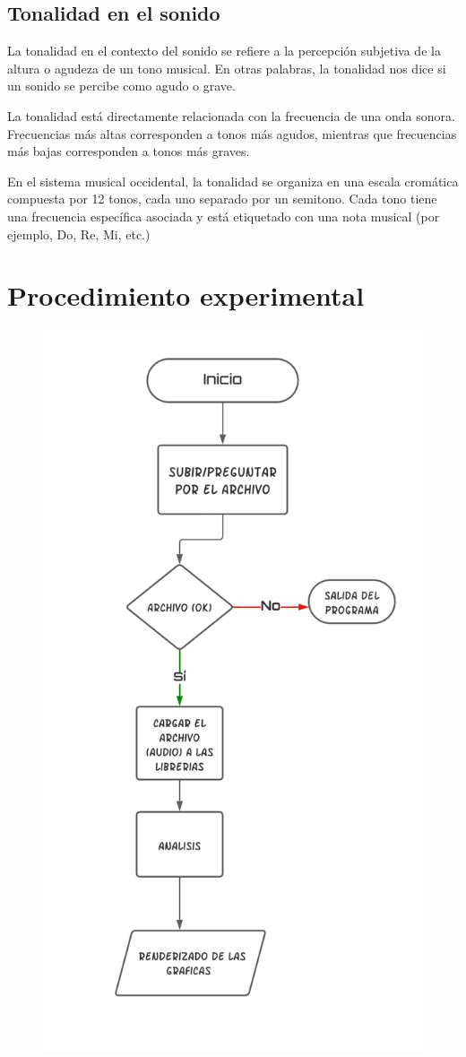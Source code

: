 \documentclass[letterpaper, 12pt]{article}
\begin{document}
\subsection*{Tonalidad en el sonido~\cite{tonalidad}}

La tonalidad en el contexto del sonido se refiere a la
percepción subjetiva de la altura o agudeza de un tono
musical. En otras palabras, la tonalidad nos dice si un
sonido se percibe como agudo o grave.

La tonalidad está directamente relacionada con la
frecuencia de una onda sonora. Frecuencias más altas
corresponden a tonos más agudos, mientras que frecuencias
más bajas corresponden a tonos más graves.

En el sistema musical occidental, la tonalidad se organiza
en una escala cromática compuesta por 12 tonos, cada uno
separado por un semitono. Cada tono tiene una frecuencia
específica asociada y está etiquetado con una nota musical
(por ejemplo, Do, Re, Mi, etc.)

\section*{Procedimiento experimental}

\begin{figure}[H]
	\begin{center}
		\includegraphics[width=.4\linewidth]{Images/Flujograma.png}
		\caption{}
	\end{center}
\end{figure}
\end{document}
